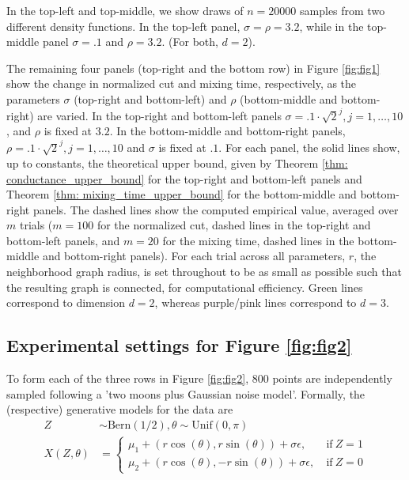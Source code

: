 \documentclass{article}
\newcommand{\1}{\mathbf{1}}
\theoremstyle{aldenthm}
\theoremstyle{aldenrmrk}
\begin{document}
In the top-left and top-middle, we show draws of $n = 20000$ samples from two different density functions. In the top-left panel, $\sigma = \rho = 3.2$, while in the top-middle panel $\sigma = .1$ and $\rho = 3.2$. (For both, $d = 2$).

The remaining four panels (top-right and the bottom row) in Figure \ref{fig:fig1} show the change in normalized cut and mixing time, respectively, as the parameters $\sigma$ (top-right and bottom-left) and $\rho$ (bottom-middle and bottom-right) are varied. In the top-right and bottom-left panels $\sigma = .1 \cdot \sqrt{2}^j, j = 1,\ldots,10$, and $\rho$ is fixed at $3.2$. In the bottom-middle and bottom-right panels, $\rho = .1 \cdot \sqrt{2}^j, j = 1,\ldots,10$ and $\sigma$ is fixed at $.1$.
For each panel, the solid lines show, up to constants, the theoretical upper bound, given by Theorem \ref{thm: conductance_upper_bound} for the top-right and bottom-left panels and Theorem \ref{thm: mixing_time_upper_bound} for the bottom-middle and bottom-right panels. The dashed lines show the computed empirical value, averaged over $m$ trials ($m = 100$ for the normalized cut, dashed lines in the top-right and bottom-left panels, and $m = 20$ for the mixing time, dashed lines in the bottom-middle and bottom-right panels). For each trial across all parameters, $r$, the neighborhood graph radius, is set throughout to be as small as possible such that the resulting graph is connected, for computational efficiency. Green lines correspond to dimension $d = 2$, whereas purple/pink lines correspond to $d = 3$. 

\subsection{Experimental settings for Figure \ref{fig:fig2}}

To form each of the three rows in Figure \ref{fig:fig2}, 800 points are independently sampled following a 'two moons plus Gaussian noise model'. Formally, the (respective) generative models for the data are
\begin{align}
Z & \sim \textrm{Bern}(1/2), \theta \sim \textrm{Unif}(0, \pi) \\
X(Z,\theta) & = 
\begin{cases}
\mu_1 + (r \cos(\theta), r \sin(\theta)) + \sigma \epsilon,~ & \text{if}~ Z = 1 \\
\mu_2 + (r \cos(\theta), - r \sin(\theta)) + \sigma \epsilon,~ & \text{if}~ Z = 0
\end{cases}
\end{align}
\end{document}
